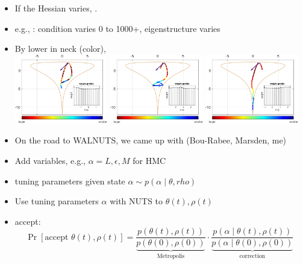 \documentclass[10pt]{report}
\begin{document}
\begin{itemize}
\item If the Hessian varies, .
\item e.g., : condition varies 0 to 1000+, eigenstructure varies 
\item By  lower in neck (color), \\[12pt]
\includegraphics[width=0.32\textwidth]{img/funnel1.pdf}%
\includegraphics[width=0.32\textwidth]{img/funnel2.pdf}%
\includegraphics[width=0.32\textwidth]{img/funnel3.pdf}
\end{itemize}

\begin{itemize}
\item On the road to WALNUTS, we came up with  (Bou-Rabee, Marsden, me)
\item Add  variables, e.g., $\alpha = L, \epsilon, M$ for HMC
\item {} tuning parameters given state $\alpha \sim p(\alpha \mid \theta, rho)$
\item Use tuning parameters $\alpha$ with NUTS to  $\theta(t), \rho(t)$
\item {} accept:
  $$
  \Pr[\textrm{accept } \theta(t), \rho(t)]
  = \dfrac{p(\theta(t), \rho(t))}{\underbrace{p(\theta(0), \rho(0))}_\textrm{Metropolis}}
    \cdot 
    \dfrac{p(\alpha \mid \theta(t), \rho(t))}{\underbrace{p(\alpha \mid \theta(0), \rho(0))}_\textrm{correction}}
    $$
\end{itemize}
\end{document}
